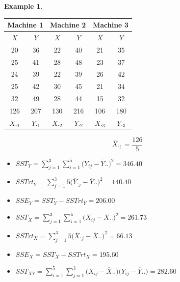 \documentclass[11pt,a4paper]{article}
\theoremstyle{definition}
\newtheorem{exa}[thm]{Example}
\begin{document}
\begin{exa}\label{res:exa:2.6.3}

\begin{table}[H]
\centering
\begin{tabular}{cc|cc|cc}
\multicolumn{2}{c|}{Machine 1} & \multicolumn{2}{c|}{Machine 2} & \multicolumn{2}{c}{Machine 3}\\
\hline
$X$ & $Y$ & $X$ & $Y$ & $X$ & $Y$\\
20  & 36  & 22  & 40  & 21  & 35\\
25  & 41  & 28  & 48  & 23  & 37\\
24  & 39  & 22  & 39  & 26  & 42\\
25  & 42  & 30  & 45  & 21  & 34\\
32  & 49  & 28  & 44  & 15  & 32\\
\hline
126 & 207 & 130 & 216 & 106 & 180\\
$X._1$ & $Y._1$ & $X._2$ & $Y._2$ & $X._3$ & $Y._3$\\
\end{tabular}
\end{table}


$$\overline{X}._1=\frac{126}{5}$$


\begin{itemize}
\item[] $SST_Y = \displaystyle{\sum^3_{j=1}\sum^5_{i=1}\big(Y_{ij}-\overline{Y}..\big)^2=346.40}$

\item[] $SSTrt_Y =\displaystyle{ \sum^3_{j=1}5\big(\overline{Y}._j-\overline{Y}..\big)^2=140.40}$

\item[] $SSE_Y = SST_Y-SSTrt_Y=206.00$\\
\end{itemize}


\begin{itemize}
\item[] $SST_X = \displaystyle{\sum^3_{j=1}\sum^5_{i=1}\big(X_{ij}-\overline{X}..\big)^2=261.73}$

\item[] $SSTrt_X = \displaystyle{\sum^3_{j=1}5\big(\overline{X}._j-\overline{X}..\big)^2=66.13}$

\item[] $SSE_X = SST_X - SSTrt_X = 195.60$\\
\end{itemize}


\begin{itemize}
\item[] $SST_{XY} =\displaystyle{\sum^5_{i=1}\sum^3_{j=1}\big(X_{ij}-\overline{X}..\big)\big(Y_{ij}-\overline{Y}..\big)=282.60}$


\end{itemize}
\end{exa}
\end{document}
